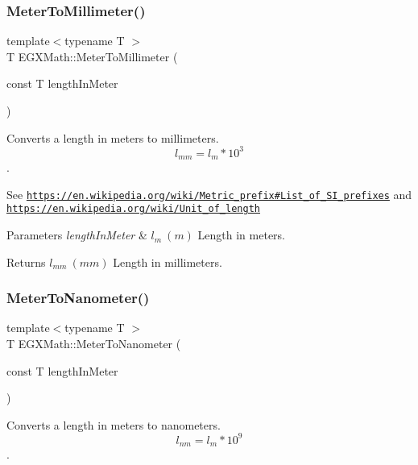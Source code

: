 \subsubsection{\texorpdfstring{Meter\+To\+Millimeter()}{MeterToMillimeter()}}
{\footnotesize\ttfamily template$<$typename T $>$ \\
T E\+G\+X\+Math\+::\+Meter\+To\+Millimeter (\begin{DoxyParamCaption}\item[{const T}]{length\+In\+Meter }\end{DoxyParamCaption})}



Converts a length in meters to millimeters. \[ l_{mm}=l_{m} * 10^{3} \]. 

See \href{https://en.wikipedia.org/wiki/Metric_prefix#List_of_SI_prefixes}{\tt https\+://en.\+wikipedia.\+org/wiki/\+Metric\+\_\+prefix\#\+List\+\_\+of\+\_\+\+S\+I\+\_\+prefixes} and \href{https://en.wikipedia.org/wiki/Unit_of_length}{\tt https\+://en.\+wikipedia.\+org/wiki/\+Unit\+\_\+of\+\_\+length} 
\begin{DoxyParams}{Parameters}
{\em length\+In\+Meter} & $ l_{m}\ (m)$ Length in meters. \\
\hline
\end{DoxyParams}
\begin{DoxyReturn}{Returns}
$ l_{mm}\ (mm)$ Length in millimeters. 
\end{DoxyReturn}
\mbox{\label{group___e_g_x_math-_conversions-_length_conversions-_s_i-_meter-_s_i_gad3532cd9d0a9b97ae34aadc0eea27c57}} 
\subsubsection{\texorpdfstring{Meter\+To\+Nanometer()}{MeterToNanometer()}}
{\footnotesize\ttfamily template$<$typename T $>$ \\
T E\+G\+X\+Math\+::\+Meter\+To\+Nanometer (\begin{DoxyParamCaption}\item[{const T}]{length\+In\+Meter }\end{DoxyParamCaption})}



Converts a length in meters to nanometers. \[ l_{nm}=l_{m} * 10^{9} \]. 

